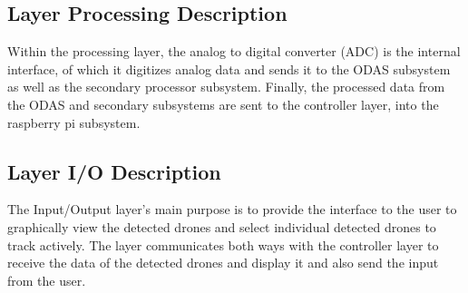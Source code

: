 \subsection{Layer Processing Description}
Within the processing layer, the analog to digital converter (ADC) is the internal interface, of which it digitizes analog data and sends it to the ODAS subsystem as well as the secondary processor subsystem.  Finally, the processed data from the ODAS and secondary subsystems are sent to the controller layer, into the raspberry pi subsystem.

\subsection{Layer I/O Description}
The Input/Output layer's main purpose is to provide the interface to the user to graphically view the detected drones and select individual detected drones to track actively. The layer communicates both ways with the controller layer to receive the data of the detected drones and display it and also send the input from the user.